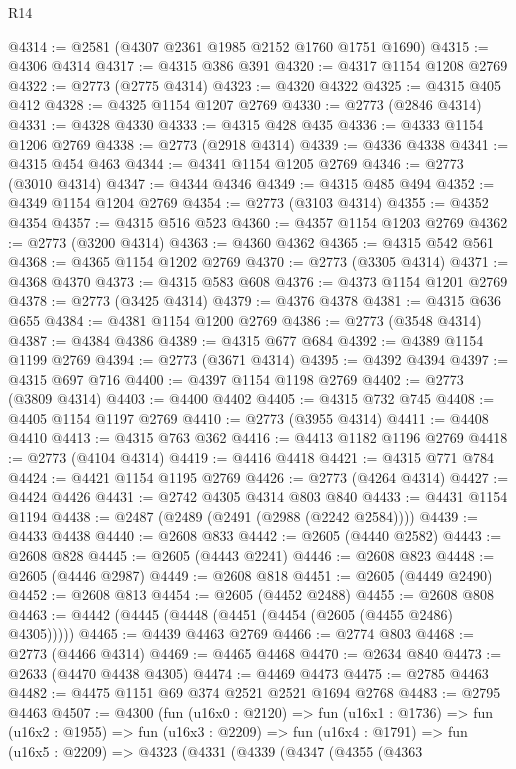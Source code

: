 \begin{lexlean}{R14}
\begin{coremodule}
@4314 := @2581 (@4307 @2361 @1985 @2152 @1760 @1751 @1690)
@4315 := @4306 @4314
@4317 := @4315 @386 @391
@4320 := @4317 @1154 @1208 @2769
@4322 := @2773 (@2775 @4314)
@4323 := @4320 @4322
@4325 := @4315 @405 @412
@4328 := @4325 @1154 @1207 @2769
@4330 := @2773 (@2846 @4314)
@4331 := @4328 @4330
@4333 := @4315 @428 @435
@4336 := @4333 @1154 @1206 @2769
@4338 := @2773 (@2918 @4314)
@4339 := @4336 @4338
@4341 := @4315 @454 @463
@4344 := @4341 @1154 @1205 @2769
@4346 := @2773 (@3010 @4314)
@4347 := @4344 @4346
@4349 := @4315 @485 @494
@4352 := @4349 @1154 @1204 @2769
@4354 := @2773 (@3103 @4314)
@4355 := @4352 @4354
@4357 := @4315 @516 @523
@4360 := @4357 @1154 @1203 @2769
@4362 := @2773 (@3200 @4314)
@4363 := @4360 @4362
@4365 := @4315 @542 @561
@4368 := @4365 @1154 @1202 @2769
@4370 := @2773 (@3305 @4314)
@4371 := @4368 @4370
@4373 := @4315 @583 @608
@4376 := @4373 @1154 @1201 @2769
@4378 := @2773 (@3425 @4314)
@4379 := @4376 @4378
@4381 := @4315 @636 @655
@4384 := @4381 @1154 @1200 @2769
@4386 := @2773 (@3548 @4314)
@4387 := @4384 @4386
@4389 := @4315 @677 @684
@4392 := @4389 @1154 @1199 @2769
@4394 := @2773 (@3671 @4314)
@4395 := @4392 @4394
@4397 := @4315 @697 @716
@4400 := @4397 @1154 @1198 @2769
@4402 := @2773 (@3809 @4314)
@4403 := @4400 @4402
@4405 := @4315 @732 @745
@4408 := @4405 @1154 @1197 @2769
@4410 := @2773 (@3955 @4314)
@4411 := @4408 @4410
@4413 := @4315 @763 @362
@4416 := @4413 @1182 @1196 @2769
@4418 := @2773 (@4104 @4314)
@4419 := @4416 @4418
@4421 := @4315 @771 @784
@4424 := @4421 @1154 @1195 @2769
@4426 := @2773 (@4264 @4314)
@4427 := @4424 @4426
@4431 := @2742 @4305 @4314 @803 @840
@4433 := @4431 @1154 @1194
@4438 := @2487 (@2489 (@2491 (@2988 (@2242 @2584))))
@4439 := @4433 @4438
@4440 := @2608 @833
@4442 := @2605 (@4440 @2582)
@4443 := @2608 @828
@4445 := @2605 (@4443 @2241)
@4446 := @2608 @823
@4448 := @2605 (@4446 @2987)
@4449 := @2608 @818
@4451 := @2605 (@4449 @2490)
@4452 := @2608 @813
@4454 := @2605 (@4452 @2488)
@4455 := @2608 @808
@4463 := @4442 (@4445 (@4448 (@4451 (@4454 (@2605 (@4455 @2486) @4305)))))
@4465 := @4439 @4463 @2769
@4466 := @2774 @803
@4468 := @2773 (@4466 @4314)
@4469 := @4465 @4468
@4470 := @2634 @840
@4473 := @2633 (@4470 @4438 @4305)
@4474 := @4469 @4473
@4475 := @2785 @4463
@4482 := @4475 @1151 @69 @374 @2521 @2521 @1694 @2768
@4483 := @2795 @4463
@4507 := @4300
    (fun (u16x0 : @2120) =>
    fun (u16x1 : @1736) =>
    fun (u16x2 : @1955) =>
    fun (u16x3 : @2209) =>
    fun (u16x4 : @1791) =>
    fun (u16x5 : @2209) =>
    @4323
      (@4331
        (@4339
          (@4347
            (@4355
              (@4363

\end{coremodule}
\end{lexlean}
